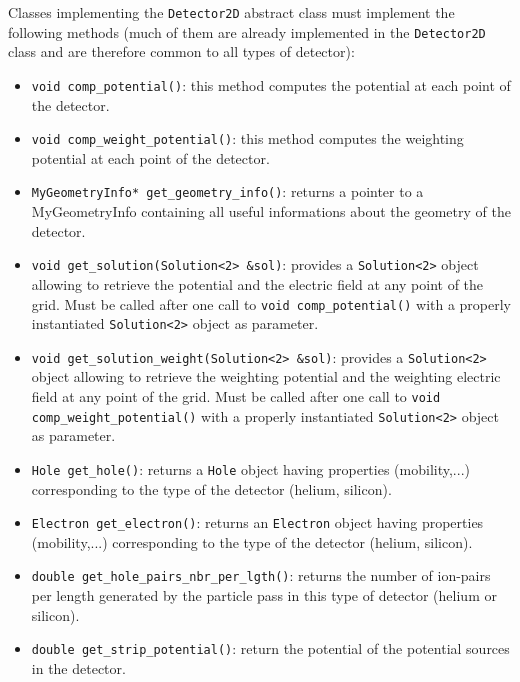 \documentclass[11pt]{article}
\begin{document}
	Classes	implementing the \texttt{Detector2D} abstract class must implement the
	 following methods (much of them are already implemented in the \texttt{Detector2D}
	 class and are therefore common to all types of detector):
	\begin{itemize}
		\item \lstinline{void comp_potential()}: this method computes the potential
		at each point of the detector.
		\item \lstinline{void comp_weight_potential()}: this method computes the
		weighting potential	at each point of the detector.
		\item \lstinline{MyGeometryInfo* get_geometry_info()}: returns a pointer
		to a MyGeometryInfo containing all useful informations about the geometry
		of the detector.

		\item \lstinline{void get_solution(Solution<2> &sol)}: provides
		a \lstinline{Solution<2>} object allowing to retrieve the potential
		and the electric field at any point of the grid. Must be called
		after one call to \lstinline{void comp_potential()} with a properly instantiated
		\lstinline{Solution<2>} object as parameter.

		\item \lstinline{void get_solution_weight(Solution<2> &sol)}: provides
		a \lstinline{Solution<2>} object allowing to retrieve the weighting potential
		and the weighting electric field at any point of the grid. Must be called
		after one call to \lstinline{void comp_weight_potential()} with a properly instantiated
		\lstinline{Solution<2>} object as parameter.

		\item \lstinline{Hole get_hole()}: returns a \texttt{Hole} object having
		properties (mobility,...) corresponding to the type of the detector (helium, silicon).

		\item \lstinline{Electron get_electron()}: returns an \texttt{Electron} object having
		properties (mobility,...) corresponding to the type of the detector (helium, silicon).

		\item \lstinline{double get_hole_pairs_nbr_per_lgth()}: returns the number
		of ion-pairs per length generated by the particle pass in this
		type of detector (helium or silicon).

		\item \lstinline{double get_strip_potential()}: return the potential of
		the potential sources in the detector.


\end{itemize}
\end{document}
